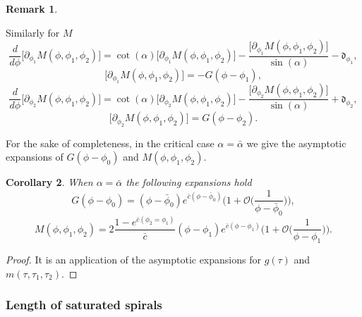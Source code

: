 \documentclass[reqno]{amsart}
\theoremstyle{definition} \newtheorem{definition}{Definition}[section]
\theoremstyle{definition} \newtheorem{remark}[definition]{Remark}
\theoremstyle{plain} \newtheorem{lemma}[definition]{Lemma}
\theoremstyle{plain} \newtheorem{proposition}[definition]{Proposition}
\theoremstyle{plain} \newtheorem{theorem}[definition]{Theorem}
\theoremstyle{plain} \newtheorem{corollary}[definition]{Corollary}
\theoremstyle{definition} \newtheorem{example}[definition]{Example}
\theoremstyle{plain} \newtheorem{claim}[clai]{Claim}
\theoremstyle{definition} \newtheorem{assumption}[definition]{Assumption}
\theoremstyle{definition} \newtheorem{observation}[definition]{Observation}
\newcommand{\1}{\mathbbm 1}
\newcommand{\Diracd}{\mathfrak{d}}
\numberwithin{equation}{section} %
\theoremstyle{plain} \newtheorem*{theorem*}{Theorem}
\theoremstyle{plain} \newtheorem{mthm}[maintheorem]{Main Theorem}
\theoremstyle{plain} \newtheorem*{mthm*}{Main Theorem}
\theoremstyle{plain} \newtheorem*{conjecture*}{Conjecture}
\theoremstyle{plain} \newtheorem{conjecture}[definition]{Conjecture}
\theoremstyle{plain} \newtheorem*{problem*}{Problem}
\begin{document}
\begin{remark}
\begin{description}
Similarly for $M$
\begin{equation*}
\frac{d}{d\phi} \big[ \partial_{\phi_1} M(\phi,\phi_1,\phi_2) \big] = \cot(\alpha) \big[ \partial_{\phi_1} M(\phi,\phi_1,\phi_2) \big] - \frac{\big[ \partial_{\phi_1} M(\phi,\phi_1,\phi_2) \big]}{\sin(\alpha)} - \Diracd_{\phi_1},
\end{equation*}
\begin{equation}
\label{Equa:der_M_phi1}
\big[ \partial_{\phi_1} M(\phi,\phi_1,\phi_2) \big] = - G(\phi - \phi_1),
\end{equation}
\begin{equation*}
\frac{d}{d\phi} \big[ \partial_{\phi_2} M(\phi,\phi_1,\phi_2) \big] = \cot(\alpha) \big[ \partial_{\phi_2} M(\phi,\phi_1,\phi_2) \big] - \frac{\big[ \partial_{\phi_2} M(\phi,\phi_1,\phi_2) \big]}{\sin(\alpha)} + \Diracd_{\phi_2},
\end{equation*}
\begin{equation*}
\big[ \partial_{\phi_2} M(\phi,\phi_1,\phi_2) \big] = G(\phi - \phi_2).
\end{equation*}
\end{description}

\end{remark}

For the sake of completeness, in the critical case $\alpha = \bar \alpha$ we give the asymptotic expansions of $G(\phi - \phi_0)$ and $M(\phi,\phi_1,\phi_2)$.

\begin{corollary}
\label{Cor:crit_G_M}
When $\alpha = \bar \alpha$ the following expansions hold
\begin{equation*}
G(\phi - \phi_0) = (\phi - \bar \phi_0) e^{\bar c (\phi - \bar \phi_0)} \bigg( 1 + \mathcal O \bigg( \frac{1}{\phi - \bar \phi_0} \bigg) \bigg),
\end{equation*}
\begin{equation*}
M(\phi,\phi_1,\phi_2) = 2 \frac{1 - e^{\bar c(\phi_2 = \phi_1)}}{\bar c} (\phi - \phi_1) e^{\bar c (\phi - \phi_1)} \bigg( 1 + \mathcal O \bigg( \frac{1}{\phi - \phi_1} \bigg) \bigg).
\end{equation*}
\end{corollary}

\begin{proof}
It is an application of the asymptotic expansions for $g(\tau)$ and $m(\tau,\tau_1,\tau_2)$.
\end{proof}


\subsubsection{Length of saturated spirals}
\label{Sss:length_saturated}
\end{document}
